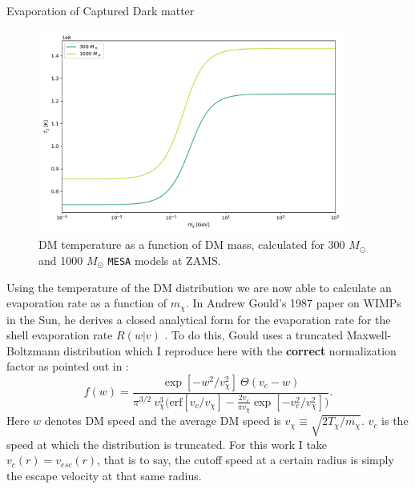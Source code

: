 \documentclass[a4paper,11pt]{article}
\begin{document}
\begin{section}{Evaporation of Captured Dark matter}
    \begin{figure}
        \centering
        \includegraphics[width=0.9\textwidth]{Tchi.pdf}
        \caption{DM temperature as a function of DM mass, calculated for 300 $M_\odot$ and 1000 $M_\odot$ \texttt{MESA} models at ZAMS.}
    \end{figure}

    Using the temperature of the DM distribution we are now able to calculate an evaporation rate as a function of $m_\chi$.
    In Andrew Gould's 1987 paper on WIMPs in the Sun, he derives a closed analytical form for the evaporation rate for the shell evaporation rate $R(w|v)$ \cite{Gould:1987}. 
    To do this, Gould uses a truncated Maxwell-Boltzmann distribution which I reproduce here with the \textbf{correct} normalization factor as pointed out in \cite{Ilie:2020popiii}:
    \begin{equation}
        f(w) = \frac{\exp[-w^2 / v_\chi^2] ~ \Theta(v_c - w) }{\pi^{3/2} ~ v_\chi^3 \bigg(\text{erf}[v_c / v_\chi] - \frac{2 v_c}{\pi v_{\chi}} \exp[-v_c^2 / v_{\chi}^2 ] \bigg)}.
        \label{evapf}
    \end{equation}
    Here $w$ denotes DM speed and the average DM speed is $v_\chi \equiv \sqrt{2T_\chi/m_\chi}$.
    $v_c$ is the speed at which the distribution is truncated. For this work I take $v_c(r) = v_{esc}(r)$, that is to say, the cutoff speed at a certain radius is simply the escape velocity at that same radius.


\end{section}
\end{document}
